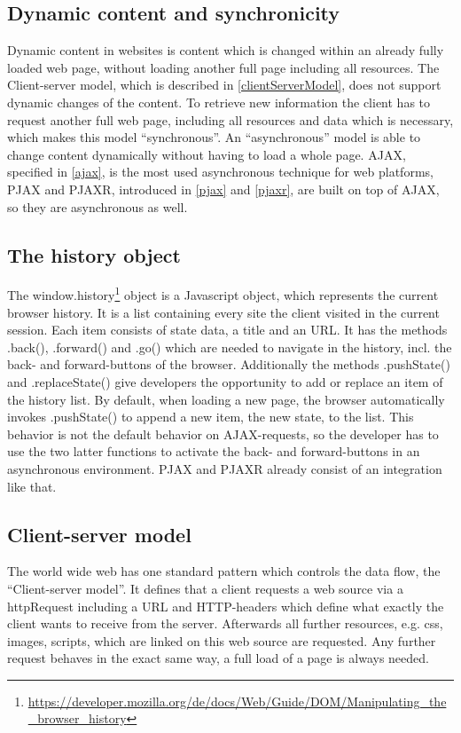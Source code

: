 \documentclass[f,bachelor,binding,twoside,palatino]{WeSTthesis}
\begin{document}
    \subsection{Dynamic content and synchronicity}
      Dynamic content in websites is content which is changed within an already fully loaded web page, without loading another full page including all resources. 
      The Client-server model, which is described in \ref{clientServerModel}, does not support dynamic changes of the content. 
      To retrieve new information the client has to request another full web page, including all resources and data which is necessary, which makes this model \enquote{synchronous}.
      An \enquote{asynchronous} model is able to change content dynamically without having to load a whole page. \gls{AJAX}, specified in \ref{ajax}, is the most used asynchronous technique for web platforms, \gls{PJAX} and \gls{PJAXR}, introduced in \ref{pjax} and \ref{pjaxr}, are built on top of \gls{AJAX}, so they are asynchronous as well.
      

      \subsection{The history object\label{theHistoryObject}}
      The window.history\footnote{\url{https://developer.mozilla.org/de/docs/Web/Guide/DOM/Manipulating_the_browser_history}} object is a Javascript object, which represents the current browser history.
      It is a list containing every site the client visited in the current session.
      Each item consists of state data, a title and an URL.
      It has the methods .back(), .forward() and .go() which are needed to navigate in the history, incl.  the back- and forward-buttons of the browser.
      Additionally the methods .pushState() and .replaceState() give developers the opportunity to add or replace an item of the history list.
      By default, when loading a new page, the browser automatically invokes .pushState() to append a new item, the new state, to the list.
      This behavior is not the default behavior on \gls{AJAX}-requests, so the developer has to use the two latter functions to activate the back- and forward-buttons in an asynchronous environment. \gls{PJAX} and \gls{PJAXR} already consist of an integration like that.


  \subsection{Client-server model\label{clientServerModel}}
    The world wide web has one standard pattern which controls the data flow, the \enquote{Client-server model}.
    It defines that a client requests a web source via a \gls{httpRequest} including a URL and HTTP-headers which define what exactly the client wants to receive from the server.
    Afterwards all further resources, e.g. css, images, scripts, which are linked on this web source are requested.
    Any further request behaves in the exact same way, a full load of a page is always needed.
\end{document}
